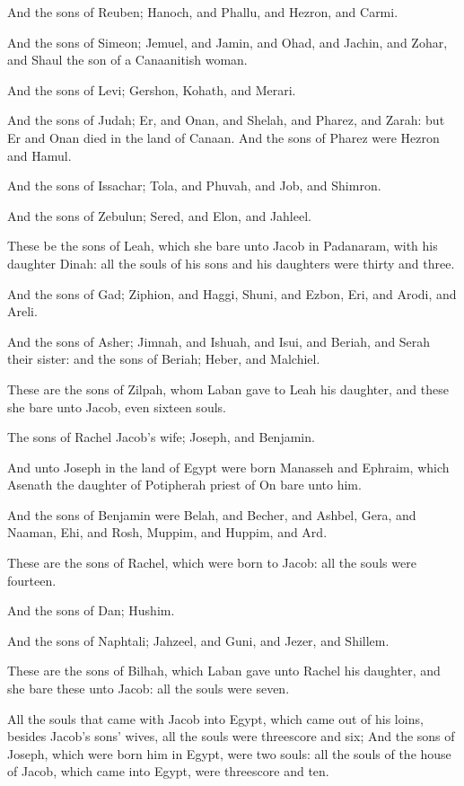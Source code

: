 \verse And the sons of Reuben; Hanoch, and Phallu, and Hezron, and
Carmi.

\verse And the sons of Simeon; Jemuel, and Jamin, and Ohad, and Jachin,
and Zohar, and Shaul the son of a Canaanitish woman.

\verse And the sons of Levi; Gershon, Kohath, and Merari.

\verse And the sons of Judah; Er, and Onan, and Shelah, and Pharez, and
Zarah: but Er and Onan died in the land of Canaan. And the sons of
Pharez were Hezron and Hamul.

\verse And the sons of Issachar; Tola, and Phuvah, and Job, and
Shimron.

\verse And the sons of Zebulun; Sered, and Elon, and Jahleel.

\verse These be the sons of Leah, which she bare unto Jacob in
Padanaram, with his daughter Dinah: all the souls of his sons and his
daughters were thirty and three.

\verse And the sons of Gad; Ziphion, and Haggi, Shuni, and Ezbon, Eri,
and Arodi, and Areli.

\verse And the sons of Asher; Jimnah, and Ishuah, and Isui, and Beriah,
and Serah their sister: and the sons of Beriah; Heber, and Malchiel.

\verse These are the sons of Zilpah, whom Laban gave to Leah his
daughter, and these she bare unto Jacob, even sixteen souls.

\verse The sons of Rachel Jacob's wife; Joseph, and Benjamin.

\verse And unto Joseph in the land of Egypt were born Manasseh and
Ephraim, which Asenath the daughter of Potipherah priest of On bare
unto him.

\verse And the sons of Benjamin were Belah, and Becher, and Ashbel,
Gera, and Naaman, Ehi, and Rosh, Muppim, and Huppim, and Ard.

\verse These are the sons of Rachel, which were born to Jacob: all the
souls were fourteen.

\verse And the sons of Dan; Hushim.

\verse And the sons of Naphtali; Jahzeel, and Guni, and Jezer, and
Shillem.

\verse These are the sons of Bilhah, which Laban gave unto Rachel his
daughter, and she bare these unto Jacob: all the souls were seven.

\verse All the souls that came with Jacob into Egypt, which came out of
his loins, besides Jacob's sons' wives, all the souls were threescore
and six; \verse And the sons of Joseph, which were born him in Egypt,
were two souls: all the souls of the house of Jacob, which came into
Egypt, were threescore and ten.

